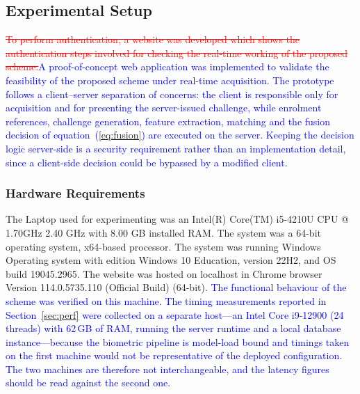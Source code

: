 \documentclass[10pt,journal,compsoc]{IEEEtran}
\begin{document}
\subsection{Experimental Setup}
\textcolor{red}{\sout{To perform authentication, a website was developed which shows the authentication steps involved for checking the real-time working of the proposed scheme.}}\textcolor{blue}{A proof-of-concept web application was implemented to validate the feasibility of the proposed scheme under real-time acquisition. The prototype follows a client--server separation of concerns: the client is responsible only for acquisition and for presenting the server-issued challenge, while enrolment references, challenge generation, feature extraction, matching and the fusion decision of equation~(\ref{eq:fusion}) are executed on the server. Keeping the decision logic server-side is a security requirement rather than an implementation detail, since a client-side decision could be bypassed by a modified client.}
\subsubsection{Hardware Requirements}\label{sec:hw}
The Laptop used for experimenting was an Intel(R) Core(TM) i5-4210U CPU @ 1.70GHz   2.40 GHz with 8.00 GB installed RAM. The system was a 64-bit operating system, x64-based processor. The system was running Windows Operating system with edition Windows 10 Education, version 22H2, and OS build 19045.2965. The website was hosted on localhost in Chrome browser Version 114.0.5735.110 (Official Build) (64-bit). \textcolor{blue}{The functional behaviour of the scheme was verified on this machine. The timing measurements reported in Section~\ref{sec:perf} were collected on a separate host---an Intel Core i9-12900 (24 threads) with 62\,GB of RAM, running the server runtime and a local database instance---because the biometric pipeline is model-load bound and timings taken on the first machine would not be representative of the deployed configuration. The two machines are therefore not interchangeable, and the latency figures should be read against the second one.}
\end{document}
